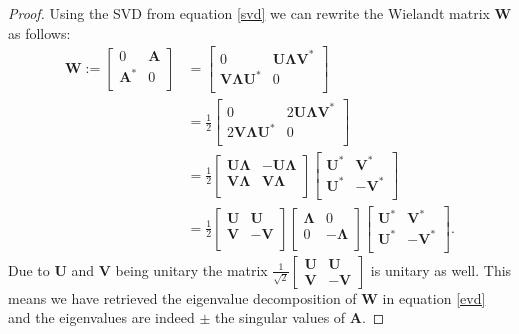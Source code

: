 \documentclass[a4paper, oneside]{discothesis}
\begin{document}
\begin{proof}
	Using the SVD from equation \ref{svd} we can rewrite the Wielandt matrix $\mathbf{W}$ as follows:
	\begin{align}
		\mathbf{W} := 
		\begin{bmatrix}
			0 & \mathbf{A} \\
			\mathbf{A}^* & 0 \\
		\end{bmatrix} &=
		\begin{bmatrix}
			0 & \mathbf{U}\boldsymbol{\Lambda}\mathbf{V}^* \\
			\mathbf{V}\boldsymbol{\Lambda}\mathbf{U}^*& 0 \\
		\end{bmatrix}\\ 
		&= \frac{1}{2}
		\begin{bmatrix}
			0 & 2\mathbf{U}\boldsymbol{\Lambda}\mathbf{V}^* \\
			2\mathbf{V}\boldsymbol{\Lambda}\mathbf{U}^*& 0 \\
		\end{bmatrix}\\ 
		&= \frac{1}{2}
		\begin{bmatrix}
			\mathbf{U}\boldsymbol{\Lambda} & -\mathbf{U}\boldsymbol{\Lambda} \\
			\mathbf{V}\boldsymbol{\Lambda}& \mathbf{V}\boldsymbol{\Lambda} \\
		\end{bmatrix} 
		\begin{bmatrix}
			\mathbf{U^*} & \mathbf{V^*} \\
			\mathbf{U^*} & -\mathbf{V^*} \\
		\end{bmatrix}\\ 
		& = \frac{1}{2}
		\begin{bmatrix}
			\mathbf{U} & \mathbf{U} \\
			\mathbf{V} & -\mathbf{V} \\
		\end{bmatrix}
		\begin{bmatrix}
			\boldsymbol{\Lambda} & 0 \\
			0 & -\boldsymbol{\Lambda} \\
		\end{bmatrix}
		\begin{bmatrix}
			\mathbf{U^*} & \mathbf{V^*} \\
			\mathbf{U^*} & -\mathbf{V^*} \\
		\end{bmatrix}. \label{evd}
	\end{align}
	Due to $\mathbf{U}$ and $\mathbf{V}$ being unitary the matrix 
	$\frac{1}{\sqrt{2}}
	\begin{bmatrix}
		\mathbf{U} & \mathbf{U} \\
		\mathbf{V} & \mathbf{-V}
	\end{bmatrix}$
	is unitary as well.
	This means we have retrieved the eigenvalue decomposition of $\mathbf{W}$ in equation \ref{evd} and the eigenvalues are indeed $\pm$ the singular values of $\mathbf{A}$.

\end{proof}
\end{document}
